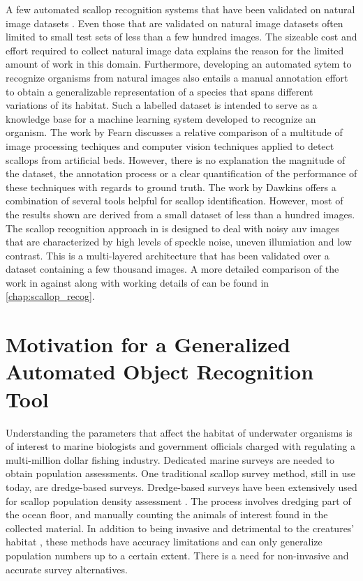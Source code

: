 \documentclass {udthesis}
\begin{document}
A few automated scallop recognition systems that have been validated on natural image datasets \cite{dawkings13,guomundsson,fearn, prasanna_med, prasanna_aslo, prasanna_igi}. Even those that are validated on natural image datasets often limited to small test sets of less than a few hundred images. The sizeable cost and effort required to collect natural image data explains the reason for the limited amount of work in this domain. Furthermore, developing an automated sytem to recognize organisms from natural images also entails a manual annotation effort to obtain a generalizable representation of a species that spans different variations of its habitat. Such a labelled dataset is intended to serve as a knowledge base for a machine learning system developed to recognize an organism. The work by Fearn \cite{fearn} discusses a relative comparison of a multitude of image processing techiques and computer vision techniques applied to detect scallops from artificial beds. However, there is no explanation the 
magnitude of the dataset, the annotation process or a clear quantification of the performance of these techniques with regards to ground truth.  The work by Dawkins \cite{dawkings13} offers a combination of several tools helpful for scallop identification. However, most of the results shown are derived from a small dataset of less than a hundred images. The scallop recognition approach in \cite{prasanna_med, prasanna_aslo, prasanna_igi} is designed to deal with noisy \gls{auv} images that are characterized by high levels of speckle noise, uneven illumiation and low contrast. This is a multi-layered architecture that has been validated over a dataset containing a few thousand images. A more detailed comparison of the work in \cite{dawkings13} against \cite{prasanna_igi} along with working details of \cite{prasanna_igi} can be found in \ref{chap:scallop_recog}.


\section{Motivation for a Generalized Automated Object Recognition Tool}

Understanding the parameters that affect the habitat of underwater organisms is of interest to marine
biologists and government officials charged with regulating a multi-million dollar fishing industry. Dedicated
marine surveys are needed to obtain population assessments. One traditional scallop survey method, still
in use today,  are dredge-based surveys. Dredge-based surveys have been extensively used for scallop population density
assessment \cite{nefsc}. The process involves dredging part of the ocean floor, and manually counting the
animals of interest found in the collected material. In addition to being invasive and
detrimental to the creatures’ habitat \cite{jenkins}, these methods have accuracy
limitations and can only generalize population numbers up to a certain extent.
There is a need for non-invasive and accurate survey alternatives.
\end{document}
